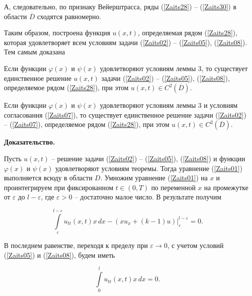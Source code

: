 А, следовательно, по признаку Вейерштрасса, ряды (\ref{Zaits28}) -- (\ref{Zaits30}) в области $\overline{D}$ сходятся равномерно.



Таким образом, построена функция $u(x,t)$, определяемая рядом (\ref{Zaits28}), которая удовлетворяет всем условиям задачи (\ref{Zaits02}) -- (\ref{Zaits05}), (\ref{Zaits08}). Тем самым доказана



\begin{theorem}[2]

Если функции $\varphi(x)$ и $\psi(x)$ удовлетворяют условиям леммы 3, то существует единственное решение $u(x,t)$ задачи (\ref{Zaits02}) -- (\ref{Zaits05}), (\ref{Zaits08}), определяемое рядом (\ref{Zaits28}), при этом $u(x,t)\in C^2(\overline{D})$.

\end{theorem}



\begin{theorem}[3]

Если функции $\varphi(x)$ и $\psi(x)$ удовлетворяют условиям леммы 3 и условиям согласования (\ref{Zaits07}), то существует единственное решение задачи (\ref{Zaits02}) -- (\ref{Zaits07}), определяемое рядом (\ref{Zaits28}), при этом $u(x,t)\in C^2(\overline{D})$.

\end{theorem}



\textbf{Доказательство.}



Пусть $u(x,t)$ -- решение задачи (\ref{Zaits02}) -- (\ref{Zaits05}), (\ref{Zaits08}) и функции $\varphi(x)$ и $\psi(x)$ удовлетворяют условиям теоремы. Тогда уравнение (\ref{Zaits01}) выполняется всюду в области $D$. Умножим уравнение (\ref{Zaits01}) на $x$ и проинтегрируем при фиксированном $t\in(0,T)$ по переменной $x$ на промежутке от $\varepsilon$ до $l-\varepsilon$, где $\varepsilon>0$ -- достаточно малое число. В результате получим

$$\int\limits_\varepsilon^{l-\varepsilon}u_{tt}(x,t)x\,dx-\left(xu_x+(k-1)u\right)\Bigr|_\varepsilon^{l-\varepsilon}=0.$$



В последнем равенстве, переходя к пределу при $\varepsilon\rightarrow0$, с учетом условий (\ref{Zaits05}) и (\ref{Zaits08}), будем иметь

\begin{equation}

\label{Zaits50}

\int\limits_0^lu_{tt}(x,t)x\,dx=0.

\end{equation}

